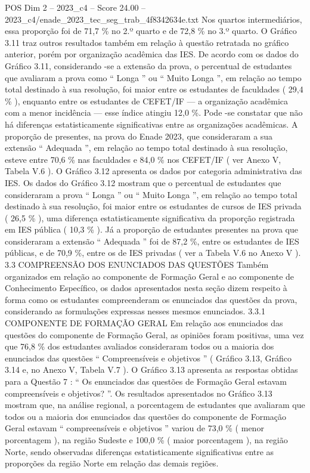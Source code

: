 \begin{textsample}{POS Dim 2 – 2023\_c4 – Score 24.00 – 2023\_c4/enade\_2023\_tec\_seg\_trab\_4f8342634e.txt}
Nos quartos intermediários, essa proporção foi de 71,7 \% no 2.º quarto e de 72,8 \% no 3.º quarto.
O Gráfico 3.11 traz outros resultados também em relação à questão retratada no gráfico anterior, porém por organização acadêmica das IES.
De acordo com os dados do Gráfico 3.11, considerando -se a extensão da prova, o percentual de estudantes que avaliaram a prova como “ Longa ” ou “ Muito Longa ”, em relação ao tempo total destinado à sua resolução, foi maior entre os estudantes de faculdades ( 29,4 \% ), enquanto entre os estudantes de CEFET/IF — a organização acadêmica com a menor incidência — esse índice atingiu 12,0 \%.
Pode -se constatar que não há diferenças estatisticamente significativas entre as organizações acadêmicas.
A proporção de presentes, na prova do Enade 2023, que consideraram a sua extensão “ Adequada ”, em relação ao tempo total destinado à sua resolução, esteve entre 70,6 \% nas faculdades e 84,0 \% nos CEFET/IF ( ver Anexo V, Tabela V.6 ).
O Gráfico 3.12 apresenta os dados por categoria administrativa das IES.
Os dados do Gráfico 3.12 mostram que o percentual de estudantes que consideraram a prova “ Longa ” ou “ Muito Longa ”, em relação ao tempo total destinado à sua resolução, foi maior entre os estudantes de cursos de IES privada ( 26,5 \% ), uma diferença estatisticamente significativa da proporção registrada em IES pública ( 10,3 \% ).
Já a proporção de estudantes presentes na prova que consideraram a extensão “ Adequada ” foi de 87,2 \%, entre os estudantes de IES públicas, e de 70,9 \%, entre os de IES privadas ( ver a Tabela V.6 no Anexo V ). 3.3 COMPREENSÃO DOS ENUNCIADOS DAS QUESTÕES Também organizados em relação ao componente de Formação Geral e ao componente de Conhecimento Específico, os dados apresentados nesta seção dizem respeito à forma como os estudantes compreenderam os enunciados das questões da prova, considerando as formulações expressas nesses mesmos enunciados. 3.3.1 COMPONENTE DE FORMAÇÃO GERAL Em relação aos enunciados das questões do componente de Formação Geral, as opiniões foram positivas, uma vez que 76,8 \% dos estudantes avaliados consideraram todos ou a maioria dos enunciados das questões “ Compreensíveis e objetivos ” ( Gráfico 3.13, Gráfico 3.14 e, no Anexo V, Tabela V.7 ).
O Gráfico 3.13 apresenta as respostas obtidas para a Questão 7 : “ Os enunciados das questões de Formação Geral estavam compreensíveis e objetivos? ”.
Os resultados apresentados no Gráfico 3.13 mostram que, na análise regional, a porcentagem de estudantes que avaliaram que todos ou a maioria dos enunciados das questões do componente de Formação Geral estavam “ compreensíveis e objetivos ” variou de 73,0 \% ( menor porcentagem ), na região Sudeste e 100,0 \% ( maior porcentagem ), na região Norte, sendo observadas diferenças estatisticamente significativas entre as proporções da região Norte em relação das demais regiões.

\end{textsample}
